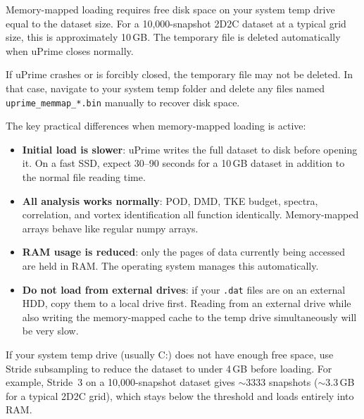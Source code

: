 \documentclass[11pt, a4paper]{report}
\newcommand{\software}[1]{\textsf{#1}}
\begin{document}
\begin{notebox}
Memory-mapped loading requires free disk space on your system temp drive equal to the dataset size. For a 10,000-snapshot 2D2C dataset at a typical grid size, this is approximately 10\,GB. The temporary file is deleted automatically when \software{uPrime} closes normally.
\end{notebox}

\begin{warnbox}
If \software{uPrime} crashes or is forcibly closed, the temporary file may not be deleted. In that case, navigate to your system temp folder and delete any files named \texttt{uprime\_memmap\_*.bin} manually to recover disk space.
\end{warnbox}

The key practical differences when memory-mapped loading is active:

\begin{itemize}[leftmargin=1.5em]
  \item \textbf{Initial load is slower}: \software{uPrime} writes the full dataset to disk before opening it. On a fast SSD, expect 30--90 seconds for a 10\,GB dataset in addition to the normal file reading time.
  \item \textbf{All analysis works normally}: POD, DMD, TKE budget, spectra, correlation, and vortex identification all function identically. Memory-mapped arrays behave like regular numpy arrays.
  \item \textbf{RAM usage is reduced}: only the pages of data currently being accessed are held in RAM. The operating system manages this automatically.
  \item \textbf{Do not load from external drives}: if your \texttt{.dat} files are on an external HDD, copy them to a local drive first. Reading from an external drive while also writing the memory-mapped cache to the temp drive simultaneously will be very slow.
\end{itemize}

\begin{tipbox}
If your system temp drive (usually C:) does not have enough free space, use Stride subsampling to reduce the dataset to under 4\,GB before loading. For example, Stride~3 on a 10,000-snapshot dataset gives $\sim$3333 snapshots ($\sim$3.3\,GB for a typical 2D2C grid), which stays below the threshold and loads entirely into RAM.
\end{tipbox}

\end{document}
